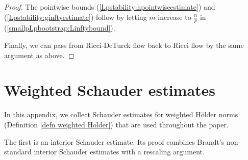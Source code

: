 \documentclass[12pt]{amsart}
\newcommand{\calM}{\mathcal{M}}
\renewcommand{\1}{{\mathbf 1}}
\newcommand{\eps}{{\varepsilon}}
\theoremstyle{others}
\numberwithin{equation}{section}
\begin{document}
\begin{proof}
The pointwise bounds (\ref{Lpstability:hpointwiseestimate}) and (\ref{Lpstability:ginftyestimate}) follow by letting $m$ increase to $\frac{n}{p}$ in (\ref{smallpLpbootstrap:Linftybound}).

Finally, we can pass from Ricci-DeTurck flow back to Ricci flow by the same argument as above. %
\end{proof}
    





\vspace{10mm}


\appendix

\section{Weighted Schauder estimates} \label{section Schauder ests}

In this appendix, we collect Schauder estimates for weighted H{\"o}lder norms (Definition \ref{defn weighted Holder}) that are used throughout the paper.


The first is an interior Schauder estimate.
Its proof combines Brandt's non-standard interior Schauder estimates \cite{Brandt69} with a rescaling argument.
\end{document}
